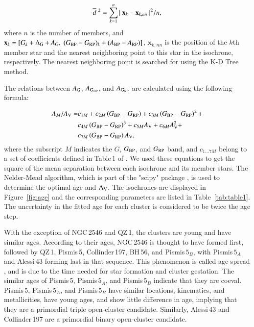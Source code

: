 \documentclass{aa} %
\begin{document}
\begin{equation} 
    \centering
    \overline{d}\ ^{2} = \sum_{k=1}^{n} | \ \textbf{{x}}_{k} - \textbf{{x}}_{k, nn} \ |^{2} / n,
    \end{equation}
where $n$ is the number of members, and 
$\textbf{{x}}_{k} = [{\it G}_{k} + \Delta_{\rm G} + {\it A}_{\rm G}, 
\ ({\it G}_{\rm BP} - {\it G}_{\rm RP})_{\it k} + ({\it A}_{\rm BP} 
- {\it A}_{\rm RP})]$, $\textbf{{x}}_{k, nn}$ is the position of the 
$k$th member star and the nearest neighboring point to this star in the
isochrone, respectively. The nearest neighboring point is searched for using the K-D Tree method.


The relations between $A_{\rm G}$, $A_{\rm {G_{BP}}}$, and $A_{\rm {G_{RP}}}$ are calculated using the  following
formula:

\begin{equation}
  \begin{split}
A_{M} / A_{\rm V} = & c_{1 M}+c_{2 M}\left(G_{\rm B P}-G_{\rm R P}\right)+c_{3 M}\left(G_{\rm B P}-G_{\rm R P}\right)^{2}+\\
                    & c_{4 M}\left(G_{\rm B P}-G_{\rm R P}\right)^{3}+c_{5 M} A_{\rm V}+c_{6 M} A_{\rm V}^{2}+\\
                    & c_{7 M}\left(G_{\rm B P}-G_{\rm R P}\right) A_{\rm V},
  \end{split}
\end{equation}
where the subscript $M$ indicates the $G$, $G_{\rm BP}$, and $G_{\rm RP}$ band, and $c_{1...7M}$ belong to a set of 
coefficients defined in Table\,1 of \citet{2018A&A...616A...1G}. We used these equations to 
get the square of the mean separation between each isochrone and its member stars. 
The Nelder-Mead algorithm, which is part of the "scipy" package \citep{2020NatMe..17..261V}, is  
used to determine the optimal age and $\rm {A_V}$. The isochrones are displayed in Figure~\ref{fig:age} 
and the corresponding parameters are listed in Table~\ref{tab:table1}. The 
uncertainty in the fitted age for each cluster is considered to be twice the age step.

With the exception of NGC\,2546 and QZ\,1, the clusters are young and have similar ages.
According to their ages, NGC\,2546 is thought to have formed first, followed by QZ\,1, Pismis\,5, Collinder\,197, BH\,56, and Pismis$\,5_{B}$, with Pismis$\,5_{A}$ and Alessi\,43 forming last in that sequence.
This phenomenon is called age spread \citep{2003ARA&A..41...57L}, and is due to the time needed for 
star formation and cluster gestation.
The similar ages of Pismis\,5, Pismis$\,5_{A}$, and Pismis$\,5_{B}$ indicate that they are coeval.
Pismis\,5, Pismis$\,5_{A}$, and Pismis$\,5_{B}$ have similar locations, kinematics, and metallicities,
have young ages, and show little difference in age, implying that they are a primordial triple open-cluster candidate.
Similarly, Alessi\,43 and Collinder\,197 are a primordial binary open-cluster candidate.
 
\end{document}
